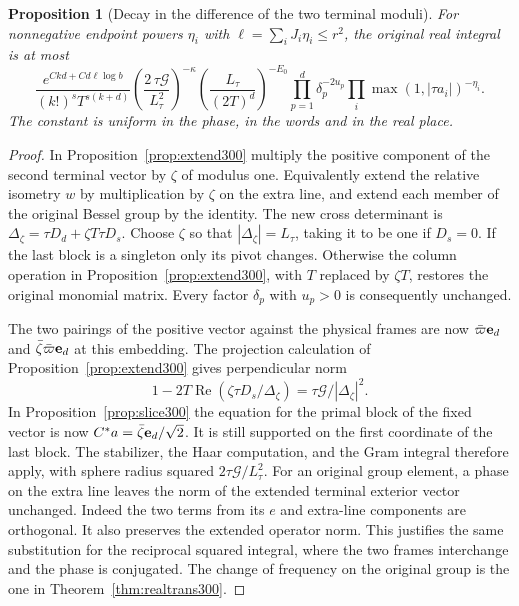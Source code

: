 \documentclass[a4paper,11pt]{article}
\newtheorem{proposition}{Proposition}[section]
\theoremstyle{definition}
\theoremstyle{remark}
\numberwithin{equation}{section}
\begin{document}
\begin{proposition}[Decay in the difference of the two terminal moduli]\leavevmode
\label{prop:phase301}
For nonnegative endpoint powers \(\eta_i\) with
\(\ell=\sum_i J_i\eta_i\le r^2\), the original real integral
is at most
\[
 \frac{e^{Ckd+C d\ell\log b}}{(k!)^s T^{s(k+d)}}
 \left(\frac{2\,\tau\mathcal G}{L_\tau^2}\right)^{-\kappa}
 \left(\frac{L_\tau}{(2T)^d}\right)^{-E_0}
 \prod_{p=1}^d\delta_p^{-2u_p}
 \prod_i\max(1,|\tau a_i|)^{-\eta_i}.
\]
The constant is uniform in the phase, in the words and in
the real place.
\end{proposition}
\begin{proof}
In Proposition~\ref{prop:extend300} multiply the positive
component of the second terminal vector by \(\zeta\) of
modulus one. Equivalently extend the relative isometry \(w\)
by multiplication by \(\zeta\) on the extra line, and extend
each member of the original Bessel group by the identity.
The new cross determinant is
\(\Delta_\zeta=\tau D_d+\zeta T\tau D_s\). Choose \(\zeta\)
so that \(|\Delta_\zeta|=L_\tau\), taking it to be one if
\(D_s=0\). If the last block is a singleton only its pivot
changes. Otherwise the column operation in
Proposition~\ref{prop:extend300}, with \(T\) replaced by
\(\zeta T\), restores the original monomial matrix.
Every factor \(\delta_p\) with \(u_p>0\) is consequently
unchanged.

The two pairings of the positive vector against the physical
frames are now \(\bar\varpi{\bf e}_d\) and
\(\bar\zeta\bar\varpi{\bf e}_d\) at this embedding.
The projection calculation of Proposition~\ref{prop:extend300}
gives perpendicular norm
\[
    1-2T\operatorname{Re}(\zeta\tau D_s/\Delta_\zeta)
                    =\tau\mathcal G/|\Delta_\zeta|^2 .
\]
In Proposition~\ref{prop:slice300} the equation for the
primal block of the fixed vector is now
\(C^*a=\bar\zeta{\bf e}_d/\sqrt2\). It is still supported
on the first coordinate of the last block. The stabilizer,
the Haar computation, and the Gram integral therefore apply,
with sphere radius squared \(2\tau\mathcal G/L_\tau^2\).
For an original group element, a phase on the extra line leaves
the norm of the extended terminal exterior vector unchanged.
Indeed the two terms from its \(e\) and extra-line components
are orthogonal. It also preserves the extended operator norm.
This justifies the same substitution for the reciprocal
squared integral, where the two frames interchange and the
phase is conjugated. The change of frequency on the original
group is the one in Theorem~\ref{thm:realtrans300}.


\end{proof}
\end{document}
